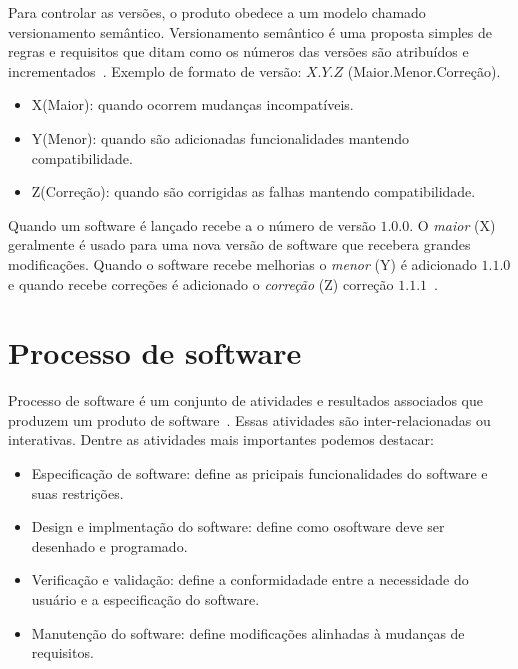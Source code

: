 Para controlar as versões, o produto obedece a um modelo chamado versionamento semântico.
Versionamento semântico é uma proposta simples de regras e requisitos que ditam como os números das versões são atribuídos e incrementados~\cite{palestino2015estudo}. 
Exemplo de formato de versão: $X.Y.Z$ (Maior.Menor.Correção).

\begin{itemize}
    \item X(Maior): quando ocorrem mudanças incompatíveis.
    \item Y(Menor): quando são adicionadas funcionalidades mantendo compatibilidade.  
    \item Z(Correção):  quando são corrigidas as falhas mantendo compatibilidade. 
    
\end{itemize}

Quando um software é lançado recebe a o número de versão $1.0.0$.
O \textit{maior} (X) geralmente é usado para uma nova versão de software que recebera grandes modificações.
Quando o software recebe melhorias o \textit{menor} (Y) é adicionado $1.1.0$ e quando recebe correções é adicionado o \textit{correção} (Z) correção $1.1.1$~\cite{versionamento}.


\section{Processo de software}

Processo de software é um conjunto de atividades e resultados associados que produzem um produto de software~\cite{sommerville2007engenharia}.
Essas atividades são inter-relacionadas ou interativas.
Dentre as atividades mais importantes podemos destacar:

\begin{itemize}
	\item Especificação de software: define as pricipais funcionalidades do software e suas restrições.
	\item Design e implmentação do software: define como osoftware deve ser desenhado e programado.
	\item Verificação e validação: define a conformidadade entre a necessidade do usuário e a especificação do software.
	\item Manutenção do software: define modificações alinhadas à mudanças de requisitos.
\end{itemize}


